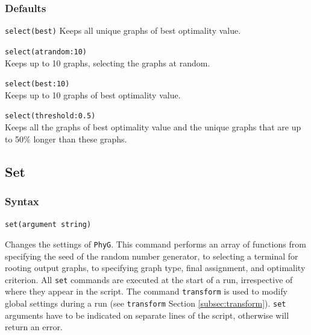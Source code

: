 	\subsubsection{Defaults}
		\texttt{select(best)} Keeps all unique graphs of best optimality value.
		
	\begin{example}
	
		\item{\texttt{select(atrandom:10)}\\ Keeps up to 10 graphs, selecting the graphs
		 at random.}
						
		\item{\texttt{select(best:10)}\\ Keeps up to 10 graphs of best optimality value.}
		
		\item{\texttt{select(threshold:0.5)}\\ Keeps all the graphs of best optimality value
		and the unique graphs that are up to 50\% longer than these graphs.}
		
	\end{example}

\subsection{Set}
\label{subsec:set}
	\subsubsection{Syntax}
		\texttt{set(argument string)}
	
	\begin{phygdescription}
		{Changes the settings of \texttt{PhyG}. This command performs an array of functions
		from specifying the seed of the random number generator, to selecting a terminal for
		rooting output graphs, to specifying  graph type, final assignment, and optimality 
		criterion. All \texttt{set} commands are executed at the start of a run, irrespective of
		where they appear in the script. The command \texttt{transform} is used to modify 
		global settings during a run (see \texttt{transform} Section \ref{subsec:transform}).
		\texttt{set} arguments have to be indicated on separate lines of the script, otherwise
		\phyg will return an error.}
	\end{phygdescription}
			
